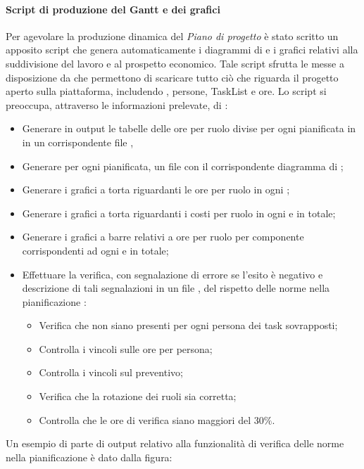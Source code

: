 \paragraph{Script di produzione del Gantt e dei grafici}
		\label{Gantt}
Per agevolare la produzione dinamica del \textit{Piano di progetto} è stato scritto un apposito script che genera automaticamente i diagrammi di  e i grafici relativi alla suddivisione del lavoro e al prospetto economico.
Tale script sfrutta le  messe a disposizione da  che permettono di scaricare tutto ciò che riguarda il progetto aperto sulla piattaforma, includendo , persone, TaskList e ore.
Lo script si preoccupa, attraverso le informazioni prelevate, di :
\begin{itemize}
\item Generare in output le tabelle delle ore per ruolo divise per ogni  pianificata in  in un corrispondente file ,
\item Generare per ogni  pianificata, un file  con il corrispondente diagramma di ;
\item Generare i grafici a torta riguardanti le ore per ruolo in ogni ;
\item Generare i grafici a torta riguardanti i costi per ruolo in ogni  e in totale;
\item Generare i grafici a barre relativi a ore per ruolo per componente corrispondenti ad ogni  e in totale;
\item Effettuare la verifica, con segnalazione di errore se l'esito è negativo e descrizione di tali segnalazioni in un file , del rispetto delle norme nella pianificazione : 
	\begin{itemize}
	\item Verifica che non siano presenti per ogni persona dei task sovrapposti;
	\item Controlla i vincoli sulle ore per persona;
	\item Controlla i vincoli sul preventivo;
	\item Verifica che la rotazione dei ruoli sia corretta;
	\item Controlla che le ore di verifica siano maggiori del 30$\%$.
	\end{itemize}
\end{itemize} 
Un esempio di parte di output relativo alla funzionalità di verifica delle norme nella pianificazione è dato dalla figura: 
